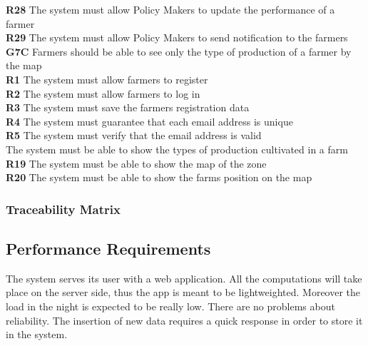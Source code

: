         \textbf{R28} The system must allow Policy Makers to update the performance of a farmer\\
        \textbf{R29} The system must allow Policy Makers to send notification to the farmers\\
        \textbf{}
        \textbf{}
        \textbf{}
        \textbf{}
    \textbf{G7C} Farmers should be able to see only the type of production of a farmer by the map\\
        \textbf{R1} The system must allow farmers to register\\
        \textbf{R2} The system must allow farmers to log in\\
        \textbf{R3} The system must save the farmers registration data\\
        \textbf{R4} The system must guarantee that each email address is unique\\
        \textbf{R5} The system must verify that the email address is valid\\
        \textbf{} The system must be able to show the types of production cultivated in a farm\\
        \textbf{R19} The system must be able to show the map of the zone\\
        \textbf{R20} The system must be able to show the farms position on the map\\
        \textbf{}
        \textbf{}
        \textbf{}
        \textbf{}
        \textbf{}
        \textbf{}
        \textbf{}
    
\textbf{}
    \textbf{}
    \textbf{}
    \textbf{}
    \textbf{}
    \textbf{}
    \textbf{}
    \textbf{}
    \textbf{}
    \textbf{}
    \textbf{}
    \textbf{}



\subsubsection{Traceability Matrix}
\subsection{Performance Requirements}
The system serves its user with a web application. All the computations will take place on the server side, 
thus the app is meant to be lightweighted. Moreover the load in the night is expected to be really low.
There are no problems about reliability. The insertion of new data requires a quick response in order to store 
it in the system.

